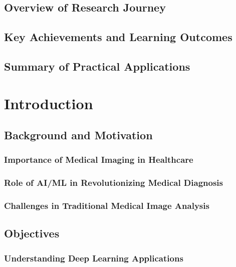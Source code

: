 \documentclass[12pt,a4paper]{report}
\begin{document}
\section{Overview of Research Journey}

\section{Key Achievements and Learning Outcomes}

\section{Summary of Practical Applications}

\chapter{Introduction}

\section{Background and Motivation}

\subsection{Importance of Medical Imaging in Healthcare}

\subsection{Role of AI/ML in Revolutionizing Medical Diagnosis}

\subsection{Challenges in Traditional Medical Image Analysis}

\section{Objectives}

\subsection{Understanding Deep Learning Applications}
\end{document}
